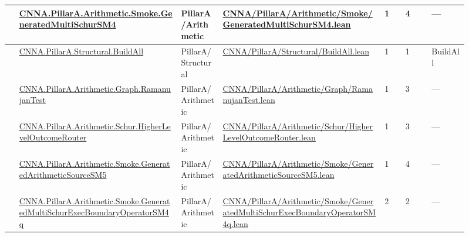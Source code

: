 \begin{longtable}{L{0.025\linewidth} L{0.315\linewidth} L{0.08\linewidth} L{0.315\linewidth} L{0.045\linewidth} L{0.055\linewidth} L{0.07\linewidth}}
\hline
{} & \href{run:repo_snapshot/CNNA/PillarA/Arithmetic/Smoke/GeneratedMultiSchurSM4.lean}{CNNA.\allowbreak{}PillarA.\allowbreak{}Arithmetic.\allowbreak{}Smoke.\allowbreak{}GeneratedMultiSchurSM4} & PillarA/\allowbreak{}Arithmetic & \href{run:repo_snapshot/CNNA/PillarA/Arithmetic/Smoke/GeneratedMultiSchurSM4.lean}{CNNA/\allowbreak{}PillarA/\allowbreak{}Arithmetic/\allowbreak{}Smoke/\allowbreak{}GeneratedMultiSchurSM4.\allowbreak{}lean} & 1 & 4 & ---\\
\hline
{} & \href{run:repo_snapshot/CNNA/PillarA/Structural/BuildAll.lean}{CNNA.\allowbreak{}PillarA.\allowbreak{}Structural.\allowbreak{}BuildAll} & PillarA/\allowbreak{}Structural & \href{run:repo_snapshot/CNNA/PillarA/Structural/BuildAll.lean}{CNNA/\allowbreak{}PillarA/\allowbreak{}Structural/\allowbreak{}BuildAll.\allowbreak{}lean} & 1 & 1 & BuildAll\\
\hline
{} & \href{run:repo_snapshot/CNNA/PillarA/Arithmetic/Graph/RamanujanTest.lean}{CNNA.\allowbreak{}PillarA.\allowbreak{}Arithmetic.\allowbreak{}Graph.\allowbreak{}RamanujanTest} & PillarA/\allowbreak{}Arithmetic & \href{run:repo_snapshot/CNNA/PillarA/Arithmetic/Graph/RamanujanTest.lean}{CNNA/\allowbreak{}PillarA/\allowbreak{}Arithmetic/\allowbreak{}Graph/\allowbreak{}RamanujanTest.\allowbreak{}lean} & 1 & 3 & ---\\
\hline
{} & \href{run:repo_snapshot/CNNA/PillarA/Arithmetic/Schur/HigherLevelOutcomeRouter.lean}{CNNA.\allowbreak{}PillarA.\allowbreak{}Arithmetic.\allowbreak{}Schur.\allowbreak{}HigherLevelOutcomeRouter} & PillarA/\allowbreak{}Arithmetic & \href{run:repo_snapshot/CNNA/PillarA/Arithmetic/Schur/HigherLevelOutcomeRouter.lean}{CNNA/\allowbreak{}PillarA/\allowbreak{}Arithmetic/\allowbreak{}Schur/\allowbreak{}HigherLevelOutcomeRouter.\allowbreak{}lean} & 1 & 3 & ---\\
\hline
{} & \href{run:repo_snapshot/CNNA/PillarA/Arithmetic/Smoke/GeneratedArithmeticSourceSM5.lean}{CNNA.\allowbreak{}PillarA.\allowbreak{}Arithmetic.\allowbreak{}Smoke.\allowbreak{}GeneratedArithmeticSourceSM5} & PillarA/\allowbreak{}Arithmetic & \href{run:repo_snapshot/CNNA/PillarA/Arithmetic/Smoke/GeneratedArithmeticSourceSM5.lean}{CNNA/\allowbreak{}PillarA/\allowbreak{}Arithmetic/\allowbreak{}Smoke/\allowbreak{}GeneratedArithmeticSourceSM5.\allowbreak{}lean} & 1 & 4 & ---\\
\hline
{} & \href{run:repo_snapshot/CNNA/PillarA/Arithmetic/Smoke/GeneratedMultiSchurExecBoundaryOperatorSM4q.lean}{CNNA.\allowbreak{}PillarA.\allowbreak{}Arithmetic.\allowbreak{}Smoke.\allowbreak{}GeneratedMultiSchurExecBoundaryOperatorSM4q} & PillarA/\allowbreak{}Arithmetic & \href{run:repo_snapshot/CNNA/PillarA/Arithmetic/Smoke/GeneratedMultiSchurExecBoundaryOperatorSM4q.lean}{CNNA/\allowbreak{}PillarA/\allowbreak{}Arithmetic/\allowbreak{}Smoke/\allowbreak{}GeneratedMultiSchurExecBoundaryOperatorSM4q.\allowbreak{}lean} & 2 & 2 & ---\\

\end{longtable}

